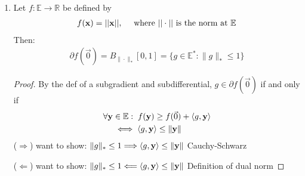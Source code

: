 \documentclass[11pt]{article}
\begin{document}
\begin{example}
    \begin{enumerate}
        \item Let $f: \mathbb{E} \to \mathbb{R}$ be defined by 
        \begin{align*}
            f({\mathbf{x}}) = ||{\mathbf{x}}||, \quad \text{ where }||\cdot || \text{ is the norm at }\mathbb{E}
        \end{align*}
        Then:
        \begin{align*}
            \partial f(\vec{0}) = B_{\|\cdot \|_{*}}[0,1] = \{ 
                g \in \mathbb{E}^{*}: \| g \| _{*} \le 1
             \}
        \end{align*}
        \begin{proof}
            By the def of a subgradient and subdifferential, $g \in \partial f(\vec{0})$ if and only if 
            \begin{align*}
                \forall {\mathbf{y}} &\in \mathbb{E}: \; f({\mathbf{y}}) \ge f(\vec{0}) + \langle g,{\mathbf{y}} \rangle\\
                &\iff \langle g,{\mathbf{y}} \rangle \le \| {\mathbf{y}} \| 
            \end{align*}
            ($\Longrightarrow$) want to show: $\| g \| _{*} \le 1 \Longrightarrow 
            \langle g,{\mathbf{y}} \rangle \le \| {\mathbf{y}} \| $
            Cauchy-Schwarz

            ($\Longleftarrow$) want to show: $\| g \| _{*} \le 1 \Longleftarrow 
            \langle g,{\mathbf{y}} \rangle \le \| {\mathbf{y}} \| $
            Definition of dual norm
        \end{proof}



\end{enumerate}
\end{example}
\end{document}
